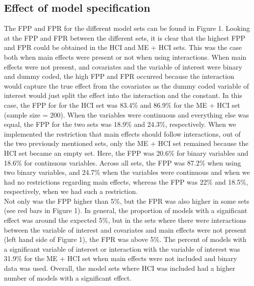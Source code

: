 \subsection{Effect of model specification}
The FPP and FPR for the different model sets can be found in Figure 1. Looking at the FPP and FPR between the different sets, it is clear that the highest FPP and FPR could be obtained in the HCI and ME + HCI sets. This was the case both when main effects were present or not when using interactions. When main effects were not present, and covariates and the variable of interest were binary and dummy coded, the high FPP and FPR occurred because the interaction would capture the true effect from the covariates as the dummy coded variable of interest would just split the effect into the interaction and the constant. In this case, the FPP for for the HCI set was 83.4\% and 86.9\% for the ME + HCI set (sample size = 200). When the variables were continuous and everything else was equal, the FPP for the two sets was 18.9\% and 24.3\%, respectively. When we implemented the restriction that main effects should follow interactions, out of the two previously mentioned sets, only the ME + HCI set remained because the HCI set became an empty set. Here, the FPP was 20.6\% for binary variables and 18.6\% for continuous variables. Across all sets, the FPP  was 87.2\% when using two binary variables, and 24.7\% when the variables were continuous and when we had no restrictions regarding main effects, whereas the FPP was 22\% and 18.5\%, respectively, when we had such a restriction.\\ 
Not only was the FPP higher than 5\%, but the FPR was also higher in some sets (see red bars in Figure 1). In general, the proportion of models with a significant effect was around the expected 5\%, but in the sets where there were interactions between the variable of interest and covariates and main effects were not present (left hand side of Figure 1), the FPR was above 5\%. The percent of models with a significant variable of interest or interaction with the variable of interest was 31.9\% for the ME + HCI set when main effects were not included and binary data was used. Overall, the model sets where HCI was included had a higher number of models with a significant effect. \\
